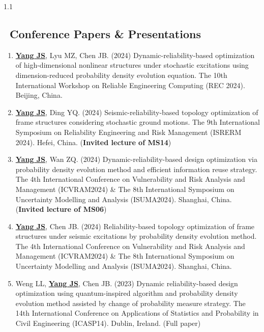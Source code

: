 \documentclass{resume}
\begin{document}
\vspace{-18pt}
\begin{spacing}{1.1}
\subsection{\faUsers\ \textbf{Conference Papers \& Presentations}}
\vspace{10pt}
\begin{enumerate}[itemsep=3pt,topsep=2pt]

  \item \underline{\textbf{Yang JS}}, Lyu MZ, Chen JB. (2024) Dynamic-reliability-based optimization of high-dimensional nonlinear structures under stochastic excitations using dimension-reduced probability density evolution equation. The 10th International Workshop on Reliable Engineering Computing (REC 2024). Beijing, China.

  \item \underline{\textbf{Yang JS}}, Ding YQ. (2024) Seismic-reliability-based topology optimization of frame structures considering stochastic ground motions. The 9th International Symposium on Reliability Engineering and Risk Management (ISRERM 2024). Hefei, China. (\textbf{Invited lecture of MS14})

  \item \underline{\textbf{Yang JS}}, Wan ZQ. (2024) Dynamic-reliability-based design optimization via probability density evolution method and efficient information reuse strategy. The 4th International Conference on Vulnerability and Risk Analysis and Management (ICVRAM2024) \& The 8th International Symposium on Uncertainty Modelling and Analysis (ISUMA2024). Shanghai, China. (\textbf{Invited lecture of MS06})
  
  \item \underline{\textbf{Yang JS}}, Chen JB. (2024) Reliability-based topology optimization of frame structures under seismic excitations by probability density evolution method. The 4th International Conference on Vulnerability and Risk Analysis and Management (ICVRAM2024) \& The 8th International Symposium on Uncertainty Modelling and Analysis (ISUMA2024). Shanghai, China.

  \item Weng LL, \underline{\textbf{Yang JS}}, Chen JB. (2023) Dynamic reliability-based design optimization using quantum-inspired algorithm and probability density evolution method assisted by change of probability measure strategy. The 14th International Conference on Applications of Statistics and Probability in Civil Engineering (ICASP14). Dublin, Ireland. (Full paper)


\end{enumerate}
\end{spacing}
\end{document}
